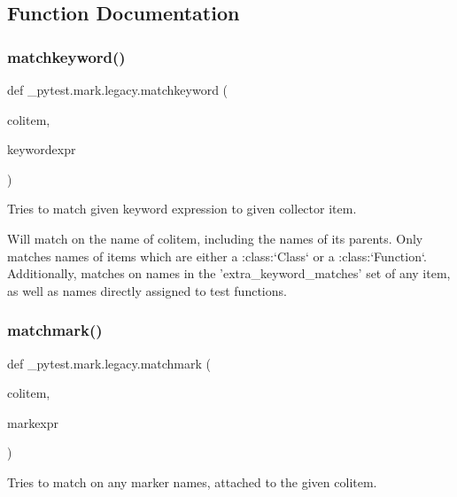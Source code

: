 \subsection{Function Documentation}
\mbox{\label{namespace__pytest_1_1mark_1_1legacy_a6ecd9fada978a1d0bb67c5ccfad4bf2d}} 
\subsubsection{\texorpdfstring{matchkeyword()}{matchkeyword()}}
{\footnotesize\ttfamily def \+\_\+pytest.\+mark.\+legacy.\+matchkeyword (\begin{DoxyParamCaption}\item[{}]{colitem,  }\item[{}]{keywordexpr }\end{DoxyParamCaption})}

\begin{DoxyVerb}Tries to match given keyword expression to given collector item.

Will match on the name of colitem, including the names of its parents.
Only matches names of items which are either a :class:`Class` or a
:class:`Function`.
Additionally, matches on names in the 'extra_keyword_matches' set of
any item, as well as names directly assigned to test functions.
\end{DoxyVerb}
 \mbox{\label{namespace__pytest_1_1mark_1_1legacy_aebb420ac9ffedfce611e0d4a1f53bb4f}} 
\subsubsection{\texorpdfstring{matchmark()}{matchmark()}}
{\footnotesize\ttfamily def \+\_\+pytest.\+mark.\+legacy.\+matchmark (\begin{DoxyParamCaption}\item[{}]{colitem,  }\item[{}]{markexpr }\end{DoxyParamCaption})}

\begin{DoxyVerb}Tries to match on any marker names, attached to the given colitem.\end{DoxyVerb}
 